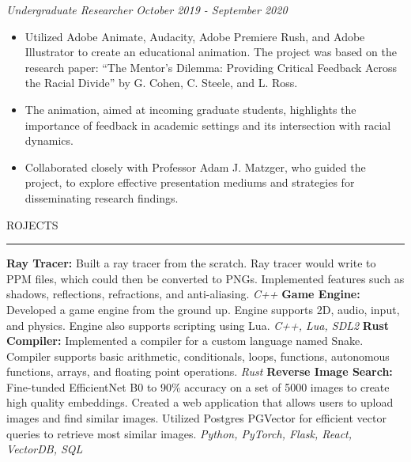 \documentclass[11pt]{article}
\begin{document}
\textbf{\scalebox{1.2}{Rackham Graduate School - University of Michigan}} \hfill \scalebox{1.1}{Ann Arbor, Michigan}
\par \textit{Undergraduate Researcher} \hfill \textit{October 2019 - September 2020}
{\small
\begin{itemize}
    \item Utilized Adobe Animate, Audacity, Adobe Premiere Rush, and Adobe Illustrator to create an educational animation. The project was based on the research paper: “The Mentor’s Dilemma: Providing Critical Feedback Across the Racial Divide” by G. Cohen, C. Steele, and L. Ross.
    \item The animation, aimed at incoming graduate students, highlights the importance of feedback in academic settings and its intersection with racial dynamics.
    \item Collaborated closely with Professor Adam J. Matzger, who guided the project, to explore effective presentation mediums and strategies for disseminating research findings.
\end{itemize}
}

\par \scalebox{1.3}{P}ROJECTS                  
\par \vspace{-0.1in} \noindent\rule{7.8in}{0.5pt} 

\textbf{Ray Tracer:} Built a ray tracer from the scratch. Ray tracer would write to PPM files, which could then be converted to PNGs. Implemented features such as shadows, reflections, refractions, and anti-aliasing. \hfill \textit{C++}
\newline
\textbf{Game Engine:} Developed a game engine from the ground up. Engine supports 2D, audio, input, and physics. Engine also supports scripting using Lua. \hfill 
\textit{C++, Lua, SDL2}
\newline
\textbf{Rust Compiler:} Implemented a compiler for a custom language named Snake. Compiler supports basic arithmetic, conditionals, loops, functions, autonomous functions, arrays, and floating point operations. \hfill \textit{Rust}
\newline
\textbf{Reverse Image Search:} Fine-tunded EfficientNet B0 to 90\% accuracy on a set of 5000 images to create high quality embeddings. Created a web application that allows users to upload images and find similar images. Utilized Postgres PGVector for efficient vector queries to retrieve most similar images. \hfill \textit{Python, PyTorch, Flask, React, VectorDB, SQL}
\newline
\end{document}
